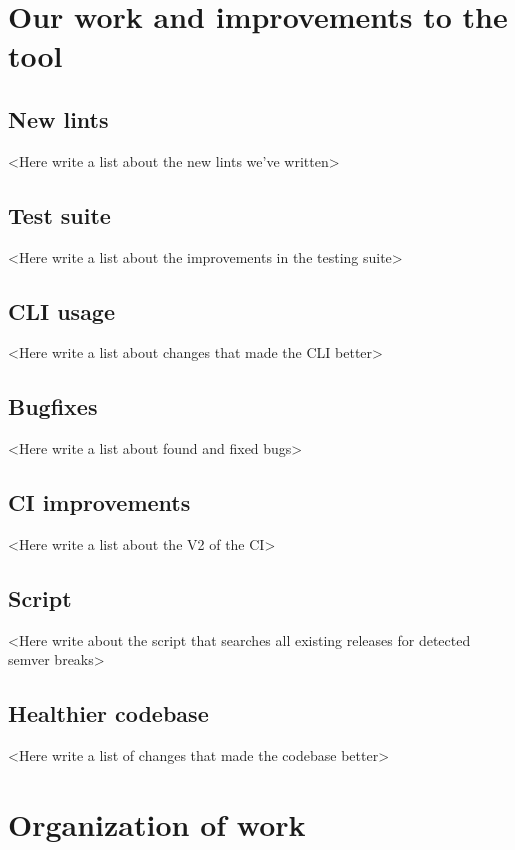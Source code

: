 \documentclass[licencjacka,en]{pracamgr}
\begin{document}
\chapter{Our work and improvements to the tool}

\section{New lints}

<Here write a list about the new lints we've written>

\section{Test suite}

<Here write a list about the improvements in the testing suite>

\section{CLI usage}

<Here write a list about changes that made the CLI better>

\section{Bugfixes}

<Here write a list about found and fixed bugs>

\section{CI improvements}

<Here write a list about the V2 of the CI>

\section{Script}

<Here write about the script that searches all existing releases for detected semver breaks>

\section{Healthier codebase}

<Here write a list of changes that made the codebase better>

\chapter{Organization of work}
\end{document}
